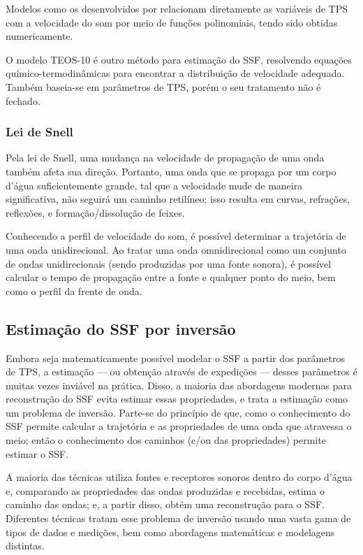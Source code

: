 Modelos como os desenvolvidos por \cite{wilson_equation_1960,mackenzie_nineterm_1981,delgrosso_new_1974} relacionam diretamente as variáveis de TPS com a velocidade do som por meio de funções polinomiais, tendo sido obtidas numericamente.

O modelo TEOS-10 \cite{mcdougall_getting_2011} é outro método para estimação do SSF, resolvendo equações químico-termodinâmicas para encontrar a distribuição de velocidade adequada. Também baseia-se em parâmetros de TPS, porém o seu tratamento não é fechado.

\subsubsection*{Lei de Snell}

Pela lei de Snell, uma mudança na velocidade de propagação de uma onda também afeta sua direção. Portanto, uma onda que se propaga por um corpo d'água suficientemente grande, tal que a velocidade mude de maneira significativa, não seguirá um caminho retilíneo; isso resulta em curvas, refrações, reflexões, e formação/dissolução de feixes.

Conhecendo a perfil de velocidade do som, é possível determinar a trajetória de uma onda unidirecional. Ao tratar uma onda omnidirecional como um conjunto de ondas unidirecionais (sendo produzidas por uma fonte sonora), é possível calcular o tempo de propagação entre a fonte e qualquer ponto do meio, bem como o perfil da frente de onda.

\subsection{Estimação do SSF por inversão}

Embora seja matematicamente possível modelar o SSF a partir dos parâmetros de TPS, a estimação --- ou obtenção através de expedições --- desses parâmetros é muitas vezes inviável na prática. Disso, a maioria das abordagens modernas para reconstrução do SSF evita estimar essas propriedades, e trata a estimação como um problema de inversão. Parte-se do princípio de que, como o conhecimento do SSF permite calcular a trajetória e as propriedades de uma onda que atravessa o meio; então o conhecimento dos caminhos (e/ou das propriedades) permite estimar o SSF.

A maioria das técnicas utiliza fontes e receptores sonoros dentro do corpo d'água e, comparando as propriedades das ondas produzidas e recebidas, estima o caminho das ondas; e, a partir disso, obtém uma reconstrução para o SSF. Diferentes técnicas tratam esse problema de inversão usando uma vasta gama de tipos de dados e medições, bem como abordagens matemáticas e modelagens distintas.

